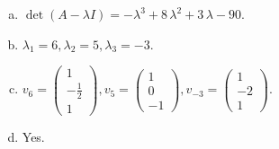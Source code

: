 \begin{questions}
\begin{solution}
\begin{enumerate}[(a)]
\item $\det(A-\lambda I)=-{\lambda}^{3} + 8 \, {\lambda}^{2} + 3 \, {\lambda} - 90$.
\item ${\lambda}_1=6, {\lambda}_2=5, {\lambda}_3=-3$.
\item $v_{6}=\left(\begin{array}{r}
1 \\
-\frac{1}{2} \\
1
\end{array}\right), v_{5}=\left(\begin{array}{r}
1 \\
0 \\
-1
\end{array}\right), v_{-3}=\left(\begin{array}{r}
1 \\
-2 \\
1
\end{array}\right)$.
\item Yes.
\end{enumerate}
\end{solution}

\end{questions}

\newpage


\begin{center}
\end{center}

